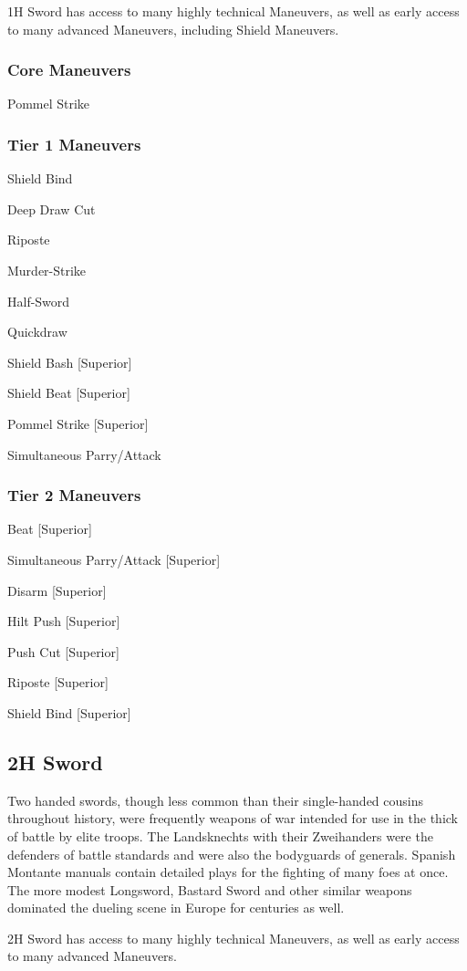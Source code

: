 \documentclass[oneside,11pt,english]{book}
\begin{document}
1H Sword has access to many highly technical Maneuvers, as well as early access to many advanced 
Maneuvers, including Shield Maneuvers.

\subsubsection{Core Maneuvers}
Pommel Strike

\subsubsection{Tier 1 Maneuvers}
Shield Bind

Deep Draw Cut

Riposte

Murder-Strike

Half-Sword

Quickdraw

Shield Bash [Superior]

Shield Beat [Superior]

Pommel Strike [Superior]

Simultaneous Parry/Attack

\subsubsection{Tier 2 Maneuvers}
Beat [Superior]

Simultaneous Parry/Attack [Superior]

Disarm [Superior]

Hilt Push [Superior]

Push Cut [Superior]

Riposte [Superior]

Shield Bind [Superior]

\subsection{2H Sword}
Two handed swords, though less common than their single-handed cousins throughout 
history, were frequently weapons of war intended for use in the thick of battle by elite troops. The 
Landsknechts with their Zweihanders were the defenders of battle standards and were also the bodyguards 
of generals. Spanish Montante manuals contain detailed plays for the fighting of many foes at once. The 
more modest Longsword, Bastard Sword and other similar weapons dominated the dueling scene in 
Europe for centuries as well. 

2H Sword has access to many highly technical Maneuvers, as well as early access to many advanced 
Maneuvers. 
\end{document}
